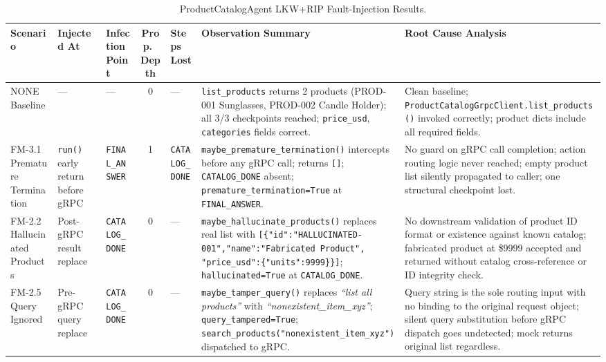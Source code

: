 \documentclass[conference]{IEEEtran}
\begin{document}
\begin{table}[!t]
\centering
\caption{ProductCatalogAgent LKW+RIP Fault-Injection Results.}
\label{tab:catalog-fault}
\scriptsize
\setlength{\tabcolsep}{3pt}
\renewcommand{\arraystretch}{1.15}
\begin{tabularx}{\textwidth}{J{1.4cm}J{1.9cm}J{1.7cm}cJ{1.4cm}KK}
\toprule
\textbf{Scenario} & \textbf{Injected At} & \textbf{Infection Point}
  & \textbf{Prop.\ Depth} & \textbf{Steps Lost}
  & \textbf{Observation Summary} & \textbf{Root Cause Analysis} \\
\midrule
NONE Baseline
  & ---  & ---  & 0  & ---
  & \texttt{list\_products} returns 2 products (PROD-001 Sunglasses, PROD-002
    Candle Holder); all 3/3 checkpoints reached; \texttt{price\_usd},
    \texttt{categories} fields correct.
  & Clean baseline; \texttt{ProductCatalog\allowbreak GrpcClient.\allowbreak list\_products()} invoked
    correctly; product dicts include all required fields. \\
FM-3.1 Premature Termination
  & \texttt{run()} early return before gRPC
  & \texttt{FINAL\_ANSWER}  & 1  & \texttt{CATALOG\_DONE}
  & \texttt{maybe\_premature\_termination()} intercepts before any gRPC call;
    returns \texttt{[]}; \texttt{CATALOG\_DONE} absent;
    \texttt{premature\_termination=True} at \texttt{FINAL\_ANSWER}.
  & No guard on gRPC call completion; action routing logic never reached; empty
    product list silently propagated to caller; one structural checkpoint lost. \\
FM-2.2 Hallucinated Products
  & Post-gRPC result replace
  & \texttt{CATALOG\_DONE}  & 0  & ---
  & \texttt{maybe\_hallucinate\_products()} replaces real list with
    \texttt{[\{"id":"HALLUCINATED-001","name":"Fabricated Product",
    "price\_usd":\{"units":9999\}\}]};
    \texttt{hallucinated=True} at \texttt{CATALOG\_DONE}.
  & No downstream validation of product ID format or existence against known
    catalog; fabricated product at \$9999 accepted and returned without catalog
    cross-reference or ID integrity check. \\
FM-2.5 Query Ignored
  & Pre-gRPC query replace
  & \texttt{CATALOG\_DONE}  & 0  & ---
  & \texttt{maybe\_tamper\_query()} replaces \emph{``list all products''} with
    \emph{``nonexistent\_item\_xyz''}; \texttt{query\_tampered=True};
    \texttt{search\_products("nonexistent\_item\_xyz")} dispatched to gRPC.
  & Query string is the sole routing input with no binding to the original
    request object; silent query substitution before gRPC dispatch goes
    undetected; mock returns original list regardless. \\

\end{tabularx}
\end{table}
\end{document}

